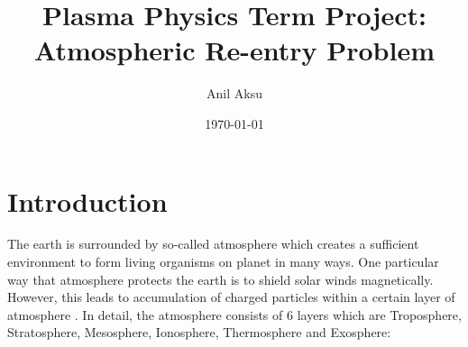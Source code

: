 \documentclass[12pt]{report}
\begin{document}
\title{Plasma Physics Term Project:
\\
 Atmospheric Re-entry Problem}
\author{Anil Aksu}
\date{\today}
\maketitle
{}
\tableofcontents
\listoffigures
\newpage
\chapter{Introduction}
The earth is surrounded by so-called atmosphere which creates a sufficient environment to form living organisms on planet in many ways. One particular way that atmosphere protects the earth  is to shield solar winds magnetically. However, this leads to accumulation of charged particles within a certain layer of atmosphere \cite{Chen}. In detail, the atmosphere consists of 6 layers which are Troposphere, Stratosphere, Mesosphere, Ionosphere, Thermosphere and Exosphere\cite{NetAtm}:  
\end{document}

